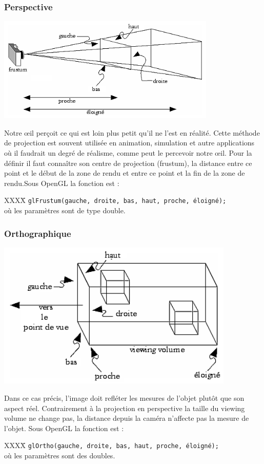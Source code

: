 \subsubsection{Perspective}
\begin{center}
	 \includegraphics[height=5cm]{img/Perspective}
 \end{center}
Notre œil perçoit ce qui est loin plus petit qu’il ne l’est en réalité. Cette méthode de projection est souvent utilisée en animation, simulation et autre applications où il faudrait un degré de réalisme, comme peut le percevoir notre œil. Pour la définir il faut connaître son centre de projection (frustum), la distance entre ce point et le début de la zone de rendu et entre ce point et la fin de la zone de rendu.Sous OpenGL la fonction est : 
\begin{tabbing}
XXXX\= \kill
\> \verb|glFrustum(gauche, droite, bas, haut, proche, éloigné);| \\où les paramètres sont de type double.
\end{tabbing}


\subsubsection{Orthographique}
\begin{center}
	 \includegraphics[height=7cm]{img/Ortho}
 \end{center}
Dans ce cas précis, l’image doit refléter les mesures de l’objet plutôt que son aspect réel. Contrairement à la projection en perspective la taille du viewing volume ne change pas, la distance depuis la caméra n’affecte pas la mesure de l’objet. Sous OpenGL la fonction est : 
\begin{tabbing}
XXXX\= \kill
\> \verb|glOrtho(gauche, droite, bas, haut, proche, éloigné);| \\où les paramètres sont des doubles.
\end{tabbing}



\newpage